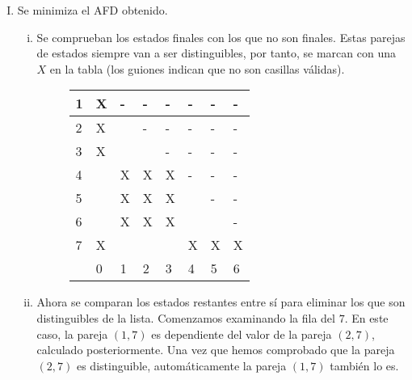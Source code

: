 \documentclass[11pt,a4paper]{article}
\begin{document}
\begin{enumerate}[a)]
\begin{enumerate}[I.]
\begin{figure}[H]
		\end{figure}
		\item Se minimiza el AFD obtenido.
			\begin{enumerate}[i.]
				\item Se comprueban los estados finales con los que no son finales. Estas parejas de estados siempre van a ser distinguibles, por tanto, se marcan con una $X$ en la tabla (los guiones indican que no son casillas válidas).
				\begin{figure}[H]
				\centering
					\begin{tabular}{|l|l|l|l|l|l|l|l|}
					\hline
					1 & X & - & - & - & - & - & - \\ \hline
					2 & X &   & - & - & - & - & - \\ \hline
					3 & X &   &   & - & - & - & - \\ \hline
					4 &   & X & X & X & - & - & - \\ \hline
					5 &	  & X & X & X &   & - & - \\ \hline
					6 &   & X & X & X &   &   & - \\ \hline
					7 & X &   &   &   & X & X & X \\ \hline
			  		  & 0 & 1 & 2 & 3 & 4 & 5 & 6 \\ \hline
					\end{tabular}
				\end{figure}
				\item Ahora se comparan los estados restantes entre sí para eliminar los que son distinguibles de la lista. Comenzamos examinando la fila del $7$. En este caso, la pareja $(1,7)$ es dependiente del valor de la pareja $(2,7)$, calculado posteriormente. Una vez que hemos comprobado que la pareja $(2,7)$ es distinguible, automáticamente la pareja $(1,7)$ también lo es.
				\begin{figure}[H]
				\centering
					\begin{tabular}{l|ll}

\end{tabular}
\end{figure}
\end{enumerate}
\end{enumerate}
\end{enumerate}
\end{document}
